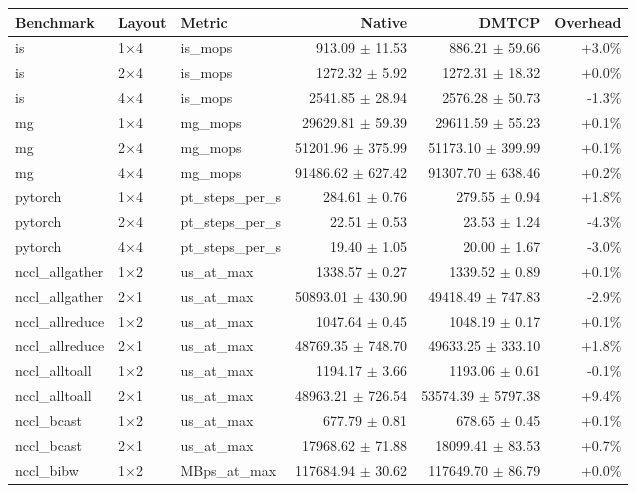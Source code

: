 \begin{tabular}{lllrrr}
\toprule
Benchmark & Layout & Metric & Native & DMTCP & Overhead \\
\midrule
is & 1$\times$4 & is\_mops & 913.09 $\pm$ 11.53 & 886.21 $\pm$ 59.66 & +3.0\% \\
is & 2$\times$4 & is\_mops & 1272.32 $\pm$ 5.92 & 1272.31 $\pm$ 18.32 & +0.0\% \\
is & 4$\times$4 & is\_mops & 2541.85 $\pm$ 28.94 & 2576.28 $\pm$ 50.73 & -1.3\% \\
mg & 1$\times$4 & mg\_mops & 29629.81 $\pm$ 59.39 & 29611.59 $\pm$ 55.23 & +0.1\% \\
mg & 2$\times$4 & mg\_mops & 51201.96 $\pm$ 375.99 & 51173.10 $\pm$ 399.99 & +0.1\% \\
mg & 4$\times$4 & mg\_mops & 91486.62 $\pm$ 627.42 & 91307.70 $\pm$ 638.46 & +0.2\% \\
pytorch & 1$\times$4 & pt\_steps\_per\_s & 284.61 $\pm$ 0.76 & 279.55 $\pm$ 0.94 & +1.8\% \\
pytorch & 2$\times$4 & pt\_steps\_per\_s & 22.51 $\pm$ 0.53 & 23.53 $\pm$ 1.24 & -4.3\% \\
pytorch & 4$\times$4 & pt\_steps\_per\_s & 19.40 $\pm$ 1.05 & 20.00 $\pm$ 1.67 & -3.0\% \\
nccl\_allgather & 1$\times$2 & us\_at\_max & 1338.57 $\pm$ 0.27 & 1339.52 $\pm$ 0.89 & +0.1\% \\
nccl\_allgather & 2$\times$1 & us\_at\_max & 50893.01 $\pm$ 430.90 & 49418.49 $\pm$ 747.83 & -2.9\% \\
nccl\_allreduce & 1$\times$2 & us\_at\_max & 1047.64 $\pm$ 0.45 & 1048.19 $\pm$ 0.17 & +0.1\% \\
nccl\_allreduce & 2$\times$1 & us\_at\_max & 48769.35 $\pm$ 748.70 & 49633.25 $\pm$ 333.10 & +1.8\% \\
nccl\_alltoall & 1$\times$2 & us\_at\_max & 1194.17 $\pm$ 3.66 & 1193.06 $\pm$ 0.61 & -0.1\% \\
nccl\_alltoall & 2$\times$1 & us\_at\_max & 48963.21 $\pm$ 726.54 & 53574.39 $\pm$ 5797.38 & +9.4\% \\
nccl\_bcast & 1$\times$2 & us\_at\_max & 677.79 $\pm$ 0.81 & 678.65 $\pm$ 0.45 & +0.1\% \\
nccl\_bcast & 2$\times$1 & us\_at\_max & 17968.62 $\pm$ 71.88 & 18099.41 $\pm$ 83.53 & +0.7\% \\
nccl\_bibw & 1$\times$2 & MBps\_at\_max & 117684.94 $\pm$ 30.62 & 117649.70 $\pm$ 86.79 & +0.0\% \\

\end{tabular}
